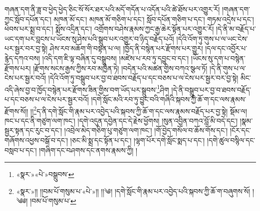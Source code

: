 གཞན་དག་ནི་ཟླ་བ་ཕྱེད་ཕྱེད་ཅིང་སོ་སོར་ཐར་པའི་མདོ་གདོན་པ་འདོན་པའི་ཚེ་ཐོས་པར་འགྱུར་རོ། །གཞན་དག་ཀྱང་སློབ་དཔོན་དང་། མཁན་མོ་དང་། མཁན་མོ་གཅིག་པ་དང་། སློབ་དཔོན་གཅིག་པ་དང་། གཏམ་འདྲེས་པ་དང་། ཕེབས་པར་སྨྲ་བ་དང་། སྨོས་འདྲིན་དང་། འགྲོགས་བཤེས་རྣམས་ཀྱང་རྒྱ་ཆེར་སྟོན་པར་འགྱུར་རོ། །དེ་ནི་མ་བརྗོད་པ་ཡང་དག་པར་བླངས་པ་ཡོངས་སུ་ཤེས་པའི་སྒྲུབ་པར་འགྱུར་བ་ཉིད་བརྗོད་པའོ། །དེའི་འོག་ཏུ་གུས་པ་ལ་ཡང་ངེས་པར་སྦྱར་བར་བྱ་སྟེ། ཤེས་རབ་མཆོག་གི་བསྟན་པ་ལ། །ཁྱོད་ནི་བསྙེན་པར་རྫོགས་པར་གྱུར། །དལ་དང་འབྱོར་པ་རྙེད་དཀའ་བས། །འདི་དག་ཇི་ལྟ་བཞིན་དུ་བསྒྲུབས། །མཛེས་པ་རབ་ཏུ་དབྱུང་བ་དང་། །ཡོངས་སུ་དག་པ་བསྙེན་རྫོགས་པར། །རྫོགས་སངས་རྒྱས་ཀྱིས་རབ་མཁྱེན་ཏེ། །བདེན་པའི་མཚན་གྱིས་བཀའ་སྩལ་ཏོ། །དེ་ནི་གུས་པ་ལ་ངེས་པར་སྦྱར་བའོ། །དེའི་འོག་ཏུ་བསྒྲུབ་པར་བྱ་བ་ཐབས་བརྗོད་པ་དང་བཅས་པ་ལ་ངེས་པར་སྦྱར་བར་བྱ་སྟེ། མིང་འདི་ཞེས་བྱ་བ་ཁྱོད་བསྙེན་པར་རྫོགས་ཟིན་གྱིས་བག་ཡོད་པར་སྒྲུབས་\footnote{«སྣར་»«པེ་»བསྒྲུབས་}ཤིག །དེ་ནི་བསྒྲུབ་པར་བྱ་བ་ཐབས་བརྗོད་པ་དང་བཅས་པ་ལ་ངེས་པར་སྦྱར་བའོ། །དགེ་སློང་མའི་རབ་ཏུ་བྱུང་བའི་གཞིའི་སྐབས་ཀྱི་ཆོ་ག་དང་ལས་རྣམས་རྫོགས་སོ།། །།\footnote{«སྣར་»།། །།བམ་པོ་གསུམ་པ་«པེ་»།། །།༄། །དགེ་སློང་གི་རྣམ་པར་འབྱེད་པའི་སྐབས་ཀྱི་ཆོ་ག་བཞུགས་སོ། །༄༅། །བམ་པོ་གསུམ་པ་}ད་ནི་དགེ་སློང་གི་རྣམ་པར་འབྱེད་པའི་སྐབས་ཀྱི་ཆོ་ག་དང་ལས་རྣམས་བརྗོད་པར་བྱ་སྟེ། སྡོམ་ལ། ཁང་པ་དང་ནི་གཙུག་ལག་ཁང་། །དགེ་འདུན་དབྱེན་དང་དེ་རྗེས་ཕྱོགས། །སུན་འབྱིན་བཀའ་བློ་མི་བདེ་དང་། །སྣམ་སྦྱར་སྟན་དང་རུང་བ་དང་། །འབྲེལ་མེད་གཅིག་པུ་གཙུག་ལག་ཁང་། །གོ་བྱེད་གསོལ་བ་ཆོས་གོས་དང་། །ངོར་དང་གཞོགས་འཕྱས་བསྒོ་བ་དང་། །ཅང་མི་སྨྲ་དང་སྟོན་པ་དང་། །ལྷག་པོར་དགེ་སློང་སྨད་པ་དང་། །དགེ་ཚུལ་བསྙིལ་དང་བསླབ་པ་དང་། །གཞིག་དང་བཤགས་དང་ནགས་རྣམས་ཀྱི། །
